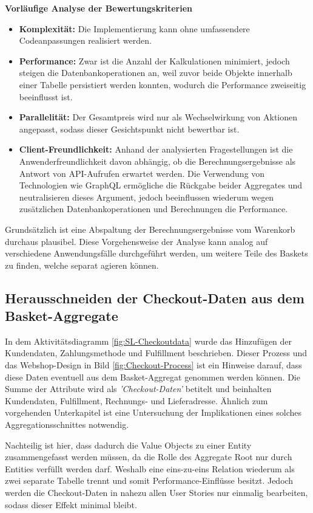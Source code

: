 \textbf{Vorläufige Analyse der Bewertungskriterien}

\begin{itemize}[topsep=-2pt]
	\item \textbf{Komplexität: } { Die Implementierung kann ohne umfassendere Codeanpassungen realisiert werden. }
	\item \textbf{Performance: } { Zwar ist die Anzahl der Kalkulationen minimiert, jedoch steigen die Datenbankoperationen an, weil zuvor beide Objekte innerhalb einer Tabelle persistiert werden konnten, wodurch die Performance zweiseitig beeinflusst ist. }
	\item \textbf{Parallelität: } { Der Gesamtpreis wird nur als Wechselwirkung von Aktionen angepasst, sodass dieser Gesichtspunkt nicht bewertbar ist. }
	\item \textbf{Client-Freundlichkeit: } { Anhand der analysierten Fragestellungen ist die Anwenderfreundlichkeit davon abhängig, ob die Berechnungsergebnisse als Antwort von API-Aufrufen erwartet werden. Die Verwendung von Technologien wie GraphQL ermögliche die Rückgabe beider Aggregates und neutralisieren dieses Argument, jedoch beeinflussen wiederum wegen zusätzlichen Datenbankoperationen und Berechnungen die Performance. }
\end{itemize}

Grundsätzlich ist eine Abspaltung der Berechnungsergebnisse vom Warenkorb durchaus plausibel. Diese Vorgehensweise der Analyse kann analog auf verschiedene Anwendungsfälle durchgeführt werden, um weitere Teile des Baskets zu finden, welche separat agieren können. 

\subsection{Herausschneiden der Checkout-Daten aus dem Basket-Aggregate}

In dem Aktivitätsdiagramm \ref{fig:SL-Checkoutdata} wurde das Hinzufügen der Kundendaten, Zahlungsmethode und Fulfillment beschrieben. Dieser Prozess und das Webshop-Design in Bild \ref{fig:Checkout-Process} ist ein Hinweise darauf, dass diese Daten eventuell aus dem Basket-Aggregat genommen werden können. Die Summe der Attribute wird als \emph{'Checkout-Daten'} betitelt und beinhalten Kundendaten, Fulfillment, Rechnungs- und Lieferadresse. Ähnlich zum vorgehenden Unterkapitel ist eine Untersuchung der Implikationen eines solches Aggregationsschnittes notwendig.

Nachteilig ist hier, dass dadurch die Value Objects zu einer Entity zusammengefasst werden müssen, da die Rolle des Aggregate Root nur durch Entities verfüllt werden darf. Weshalb eine eins-zu-eins Relation wiederum als zwei separate Tabelle trennt und somit Performance-Einflüsse besitzt. Jedoch werden die Checkout-Daten in nahezu allen User Stories nur einmalig bearbeiten, sodass dieser Effekt minimal bleibt.

